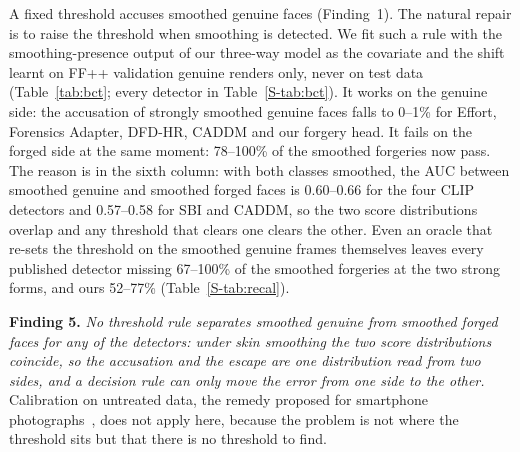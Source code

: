 \documentclass[conference]{IEEEtran}
\begin{document}
A fixed threshold accuses smoothed genuine faces (Finding~1). The natural repair is to raise the threshold when smoothing is
detected. We fit such a rule with the smoothing-presence output of our three-way model as the covariate and the shift learnt
on FF++ validation genuine renders only, never on test data (Table~\ref{tab:bct}; every detector in Table~\ref{S-tab:bct}). It works on the genuine side: the
accusation of strongly smoothed genuine faces falls to 0--1\% for Effort, Forensics Adapter, DFD-HR, CADDM and our forgery
head.
It fails on the forged side at the same moment: 78--100\% of the smoothed forgeries now pass.
The reason is in the sixth column: with both classes smoothed, the AUC between smoothed genuine and smoothed forged faces is
0.60--0.66 for the four CLIP detectors and 0.57--0.58 for SBI and CADDM, so the two score distributions overlap and any
threshold that clears one clears the other.
Even an oracle that re-sets the threshold on the smoothed genuine frames themselves leaves every published detector
missing 67--100\% of the smoothed forgeries at the two strong forms, and ours 52--77\% (Table~\ref{S-tab:recal}).

\textbf{Finding 5.} \emph{No threshold rule separates smoothed genuine from smoothed forged faces for any of the
detectors: under skin smoothing the two score distributions coincide, so the accusation and the escape are one distribution
read from two sides, and a decision rule can only move the error from one side to the other.} Calibration on untreated data,
the remedy proposed for smartphone photographs~\cite{laionmobile2026}, does not apply here, because the problem is not where
the threshold sits but that there is no threshold to find.
\end{document}
